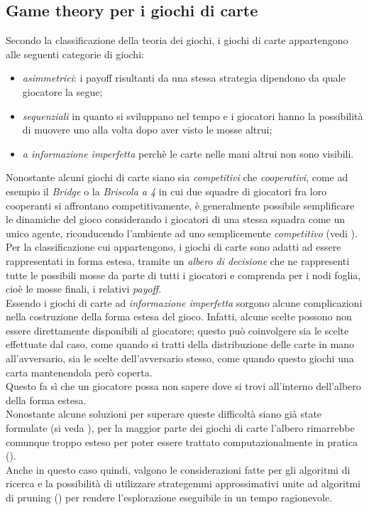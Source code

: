 \subsection{Game theory per i giochi di carte}

Secondo la classificazione della teoria dei giochi, i giochi di carte appartengono alle seguenti categorie di giochi:

\begin{itemize}
   \item \emph{asimmetrici}: i payoff risultanti da una stessa strategia dipendono da quale giocatore la segue;
   \item \emph{sequenziali} in quanto si sviluppano nel tempo e i giocatori hanno la possibilità di muovere uno alla volta dopo aver visto le mosse altrui;
   \item \emph{a informazione imperfetta}  perchè le carte nelle mani altrui non sono visibili.
\end{itemize}

Nonostante alcuni giochi di carte siano sia \emph{competitivi} che \emph{cooperativi}, come ad esempio il \emph{Bridge} o la \emph{Briscola a 4} in cui due squadre di giocatori fra loro cooperanti si affrontano competitivamente, è generalmente possibile semplificare le dinamiche del gioco considerando i giocatori di una stessa squadra come un unico agente, riconducendo l'ambiente ad uno semplicemente \emph{competitivo} (vedi \cite{pavel}).\\
Per la classificazione cui appartengono, i giochi di carte sono adatti ad essere rappresentati in forma estesa, tramite un \emph{albero di decisione} che ne rappresenti tutte le possibili mosse da parte di tutti i giocatori e comprenda per i nodi foglia, cioè le mosse finali, i relativi \emph{payoff}.\\
Essendo i giochi di carte ad \emph{informazione imperfetta} sorgono alcune complicazioni nella costruzione della forma estesa del gioco.
Infatti, alcune scelte possono non essere direttamente disponibili al giocatore; questo può coinvolgere sia le scelte effettuate dal caso, come quando si tratti della distribuzione delle carte in mano all'avversario, sia le scelte dell'avversario stesso, come quando questo giochi una carta mantenendola però coperta.\\
Questo fa sì che un giocatore possa non sapere dove si trovi all'interno dell'albero della forma estesa.\\
Nonostante alcune soluzioni per superare queste difficoltà siano già state formulate (si veda \cite{wiley}), per la maggior parte dei giochi di carte l'albero rimarrebbe comunque troppo esteso per poter essere trattato computazionalmente in pratica (\cite{frank}).\\
Anche in questo caso quindi, valgono le considerazioni fatte per gli algoritmi di ricerca e la possibilità di utilizzare strategemmi approssimativi unite ad algoritmi di pruning (\cite{pavel}) per rendere l'esplorazione eseguibile in un tempo ragionevole.
